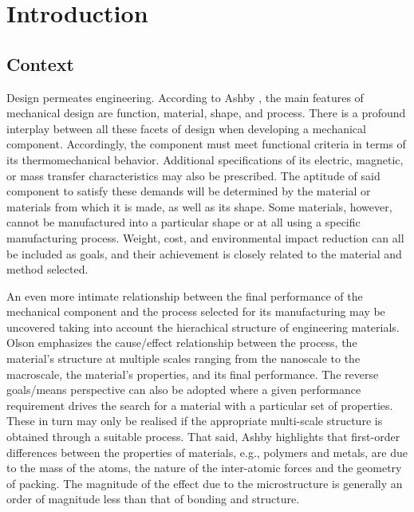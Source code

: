 \chapter{Introduction}

\section{Context}

Design permeates engineering.
According to Ashby \citep{ashbyMaterialsSelectionMechanical1999}, the main features of mechanical design are function, material, shape, and process.
There is a profound interplay between all these facets of design when developing a mechanical component.
Accordingly, the component must meet functional criteria in terms of its thermomechanical behavior.
Additional specifications of its electric, magnetic, or mass transfer characteristics may also be prescribed.
The aptitude of said component to satisfy these demands will be determined by the material or materials from which it is made, as well as its shape.
Some materials, however, cannot be manufactured into a particular shape or at all using a specific manufacturing process.
Weight, cost, and environmental impact reduction can all be included as goals, and their achievement is closely related to the material and method selected.

An even more intimate relationship between the final performance of the mechanical component and the process selected for its manufacturing may be uncovered taking into account the hierachical structure of engineering materials.
Olson \citep{olsonDesigningNewMaterial2000} emphasizes the cause/effect relationship between the process, the material's structure at multiple scales ranging from the nanoscale to the macroscale, the material's properties, and its final performance.
The reverse goals/means perspective can also be adopted where a given performance requirement drives the search for a material with a particular set of properties.
These in turn may only be realised if the appropriate multi-scale structure is obtained through a suitable process.
That said, Ashby \citep{ashbyMaterialsSelectionMechanical1999} highlights that first-order differences between the properties of materials, e.g., polymers and metals, are due to the mass of the atoms, the nature of the inter-atomic forces and the geometry of packing.
The magnitude of the effect due to the microstructure is generally an order of magnitude less than that of bonding and structure.

